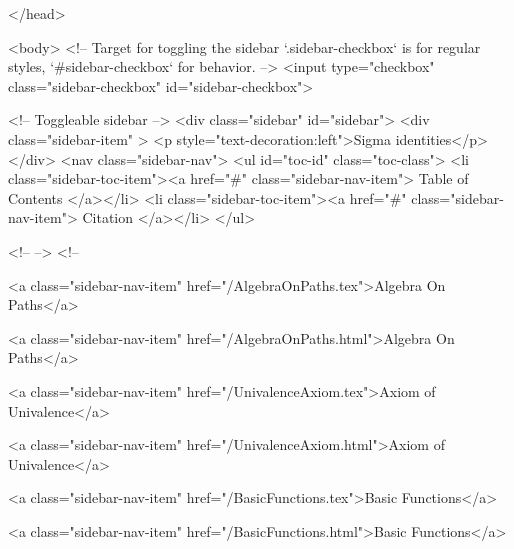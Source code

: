  
</head>




  <body>
    <!-- Target for toggling the sidebar `.sidebar-checkbox` is for regular
     styles, `#sidebar-checkbox` for behavior. -->
<input type="checkbox" class="sidebar-checkbox" id="sidebar-checkbox">

<!-- Toggleable sidebar -->
<div class="sidebar" id="sidebar">
  <div class="sidebar-item" >
    <p style="text-decoration:left">Sigma identities</p>
  </div>
  <nav class="sidebar-nav">
    <ul id="toc-id" class="toc-class">
  <li class="sidebar-toc-item"><a href="#" class="sidebar-nav-item"> Table of Contents </a></li>
  <li class="sidebar-toc-item"><a href="#" class="sidebar-nav-item"> Citation </a></li>
</ul>


    <!--  -->
    <!-- 
      
    
      
    
      
    
      
        
      
    
      
        
          <a class="sidebar-nav-item" href="/AlgebraOnPaths.tex">Algebra On Paths</a>
        
      
    
      
        
          <a class="sidebar-nav-item" href="/AlgebraOnPaths.html">Algebra On Paths</a>
        
      
    
      
        
          <a class="sidebar-nav-item" href="/UnivalenceAxiom.tex">Axiom of Univalence</a>
        
      
    
      
        
          <a class="sidebar-nav-item" href="/UnivalenceAxiom.html">Axiom of Univalence</a>
        
      
    
      
        
          <a class="sidebar-nav-item" href="/BasicFunctions.tex">Basic Functions</a>
        
      
    
      
        
          <a class="sidebar-nav-item" href="/BasicFunctions.html">Basic Functions</a>
        
      
    
      
        
